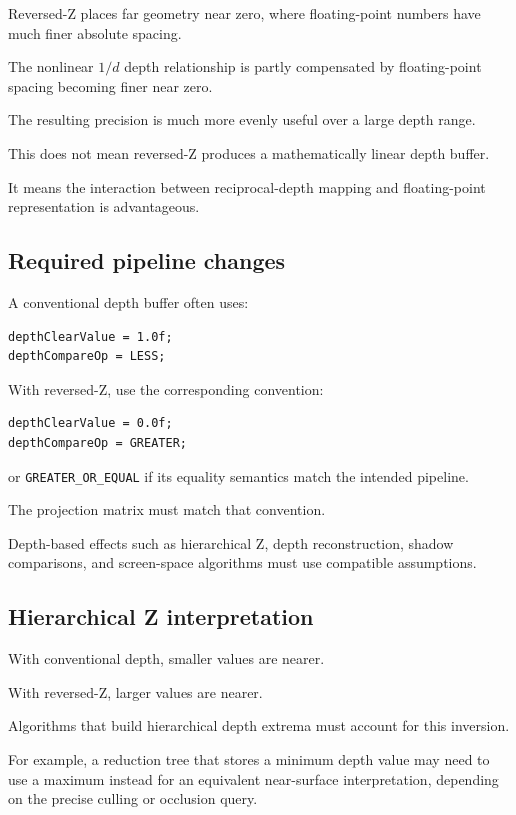 Reversed-Z places far geometry near zero, where floating-point numbers have much finer absolute spacing.

The nonlinear \(1/d\) depth relationship is partly compensated by floating-point spacing becoming finer near zero.

The resulting precision is much more evenly useful over a large depth range.

This does not mean reversed-Z produces a mathematically linear depth buffer.

It means the interaction between reciprocal-depth mapping and floating-point representation is advantageous.

\subsection{Required pipeline changes}\label{02-foundations-ii-ch033-required-pipeline-changes}

A conventional depth buffer often uses:

\begin{verbatim}
depthClearValue = 1.0f;
depthCompareOp = LESS;
\end{verbatim}

With reversed-Z, use the corresponding convention:

\begin{verbatim}
depthClearValue = 0.0f;
depthCompareOp = GREATER;
\end{verbatim}

or \texttt{GREATER\_OR\_EQUAL} if its equality semantics match the intended pipeline.

The projection matrix must match that convention.

Depth-based effects such as hierarchical Z, depth reconstruction, shadow comparisons, and screen-space algorithms must use compatible assumptions.

\subsection{Hierarchical Z interpretation}\label{02-foundations-ii-ch033-hierarchical-z-interpretation}

With conventional depth, smaller values are nearer.

With reversed-Z, larger values are nearer.

Algorithms that build hierarchical depth extrema must account for this inversion.

For example, a reduction tree that stores a minimum depth value may need to use a maximum instead for an equivalent near-surface interpretation, depending on the precise culling or occlusion query.

